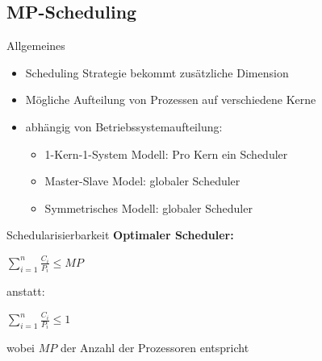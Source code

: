 \subsection{MP-Scheduling}
\begin{frame}{Allgemeines}
	\begin{itemize}
		\item Scheduling Strategie bekommt zusätzliche Dimension
		\item Mögliche Aufteilung von Prozessen auf verschiedene Kerne
		\item abhängig von Betriebssystemaufteilung:
		\begin{itemize}
			\item 1-Kern-1-System Modell: Pro Kern ein Scheduler
			\item Master-Slave Model: globaler Scheduler
			\item Symmetrisches Modell: globaler Scheduler
		\end{itemize}
	\end{itemize}
\end{frame}

\begin{frame}{Schedularisierbarkeit}
	\textbf{Optimaler Scheduler:}
	\begin{center}
		\(\sum\limits_{i=1}^{n}\frac{C_i}{P_i} \leq MP\)
	\end{center}
	anstatt:
	\begin{center}
		\(\sum\limits_{i=1}^{n}\frac{C_i}{P_i} \leq 1\)
	\end{center}
	wobei \(MP\) der Anzahl der Prozessoren entspricht
\end{frame}
